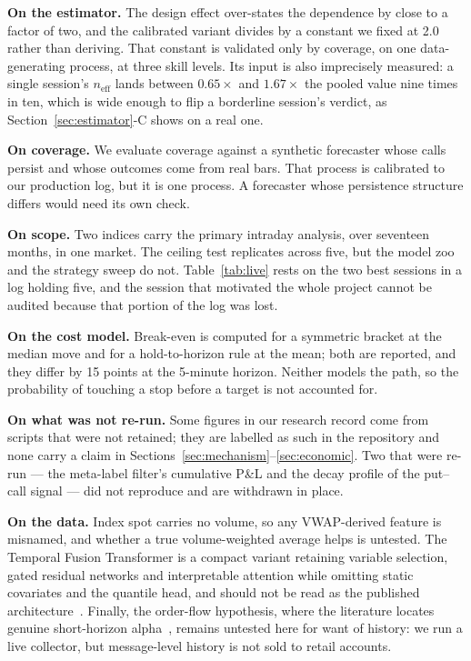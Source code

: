 \documentclass[conference]{IEEEtran}
\begin{document}
\textbf{On the estimator.} The design effect over-states the dependence by
close to a factor of two, and the calibrated variant divides by a constant we
fixed at 2.0 rather than deriving. That constant is validated only by coverage,
on one data-generating process, at three skill levels. Its input is also
imprecisely measured: a single session's $n_{\text{eff}}$ lands between
$0.65\times$ and $1.67\times$ the pooled value nine times in ten, which is wide
enough to flip a borderline session's verdict, as
Section~\ref{sec:estimator}-C shows on a real one.

\textbf{On coverage.} We evaluate coverage against a synthetic forecaster whose
calls persist and whose outcomes come from real bars. That process is calibrated
to our production log, but it is one process. A forecaster whose persistence
structure differs would need its own check.

\textbf{On scope.} Two indices carry the primary intraday analysis, over
seventeen months, in one market. The ceiling test replicates across five, but
the model zoo and the strategy sweep do not. Table~\ref{tab:live} rests on the
two best sessions in a log holding five, and the session that motivated the
whole project cannot be audited because that portion of the log was lost.

\textbf{On the cost model.} Break-even is computed for a symmetric bracket at
the median move and for a hold-to-horizon rule at the mean; both are reported,
and they differ by 15 points at the 5-minute horizon. Neither models the path,
so the probability of touching a stop before a target is not accounted for.

\textbf{On what was not re-run.} Some figures in our research record come from
scripts that were not retained; they are labelled as such in the repository and
none carry a claim in Sections~\ref{sec:mechanism}--\ref{sec:economic}. Two that
were re-run --- the meta-label filter's cumulative P\&L and the decay profile of
the put--call signal --- did not reproduce and are withdrawn in place.

\textbf{On the data.} Index spot carries no volume, so any VWAP-derived feature
is misnamed, and whether a true volume-weighted average helps is untested. The
Temporal Fusion Transformer is a compact variant retaining variable selection,
gated residual networks and interpretable attention while omitting static
covariates and the quantile head, and should not be read as the published
architecture~\cite{lim2021}. Finally, the order-flow hypothesis, where the
literature locates genuine short-horizon alpha~\cite{kolm2023,zhang2019},
remains untested here for want of history: we run a live collector, but
message-level history is not sold to retail accounts.
\end{document}
